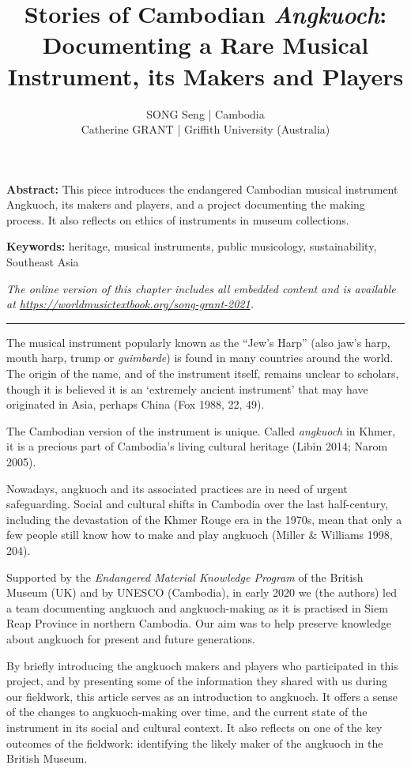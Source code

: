 \documentclass[twoside]{article}
\title{Stories of Cambodian \emph{Angkuoch}: Documenting a Rare Musical Instrument, its Makers and Players}
\author{SONG Seng | Cambodia\\Catherine GRANT | Griffith University (Australia)}
\date{}
\makeatletter
\renewcommand{\maketitle}{\bgroup\setlength{\parindent}{0pt}
\begin{flushleft}
  \vspace*{3\baselineskip}
  \huge{\textbf{\@title}}

  \medskip
  
  \large{\@author}
\end{flushleft}\egroup
}
\providecommand{\abstracttext}[1]
{
  \noindent
  \textbf{Abstract:} #1
}
\providecommand{\keywords}[1]
{
  \newline
  \textbf{Keywords:} #1
}
\providecommand{\wmturl}{\href{https://worldmusictextbook.org/song-grant-2021}{https://worldmusictextbook.org/song-grant-2021}}
\providecommand{\wmturltext}{
  \noindent\emph{The online version of this chapter includes all embedded content and is available at \wmturl.}
}
\makeatother
\begin{document}
\suppressfloats %
\maketitle

\abstracttext{This piece introduces the endangered Cambodian musical instrument Angkuoch, its makers and players, and a project documenting the making process. It also reflects on ethics of instruments in museum collections.}
\keywords{heritage, musical instruments, public musicology, sustainability, Southeast Asia}

\smallskip

\wmturltext

\medskip

\noindent\hfil\rule{0.5\textwidth}{0.4pt}\hfil

\bigskip

The musical instrument popularly known as the ``Jew's Harp'' (also jaw's
harp, mouth harp, trump or \emph{guimbarde}) is found in many countries
around the world. The origin of the name, and of the instrument itself,
remains unclear to scholars, though it is believed it is an `extremely
ancient instrument' that may have originated in Asia, perhaps China (Fox
1988, 22, 49).

The Cambodian version of the instrument is unique. Called
\emph{angkuoch} in Khmer, it is a precious part of Cambodia's living
cultural heritage (Libin 2014; Narom 2005).

Nowadays, angkuoch and its associated practices are in need of urgent
safeguarding. Social and cultural shifts in Cambodia over the last
half-century, including the devastation of the Khmer Rouge era in the
1970s, mean that only a few people still know how to make and play
angkuoch (Miller \& Williams 1998, 204).

Supported by the \emph{Endangered Material Knowledge Program} of the
British Museum (UK) and by UNESCO (Cambodia), in early 2020 we (the
authors) led a team documenting angkuoch and angkuoch-making as it is
practised in Siem Reap Province in northern Cambodia. Our aim was to
help preserve knowledge about angkuoch for present and future
generations.

By briefly introducing the angkuoch makers and players who participated
in this project, and by presenting some of the information they shared
with us during our fieldwork, this article serves as an introduction to
angkuoch. It offers a sense of the changes to angkuoch-making over time,
and the current state of the instrument in its social and cultural
context. It also reflects on one of the key outcomes of the fieldwork:
identifying the likely maker of the angkuoch in the British Museum.
\end{document}
